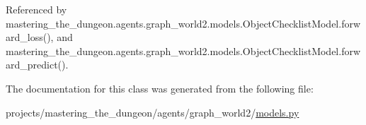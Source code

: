 Referenced by mastering\+\_\+the\+\_\+dungeon.\+agents.\+graph\+\_\+world2.\+models.\+Object\+Checklist\+Model.\+forward\+\_\+loss(), and mastering\+\_\+the\+\_\+dungeon.\+agents.\+graph\+\_\+world2.\+models.\+Object\+Checklist\+Model.\+forward\+\_\+predict().



The documentation for this class was generated from the following file\+:\begin{DoxyCompactItemize}
\item 
projects/mastering\+\_\+the\+\_\+dungeon/agents/graph\+\_\+world2/\hyperlink{models_8py}{models.\+py}\end{DoxyCompactItemize}

